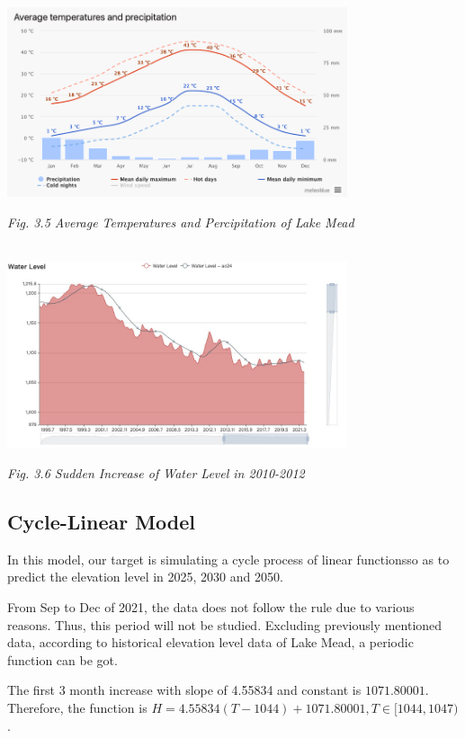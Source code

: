\documentclass[12pt]{article}
\theoremstyle{definition}
\theoremstyle{remark}
\numberwithin{equation}{section}
\begin{document}
		\begin{center}
			\includegraphics[width=10cm]{3.5 Average Temperatures and Percipitation of Lake Mead.png}
			
			\small \textit{Fig. 3.5 Average Temperatures and Percipitation of Lake Mead \cite{Temperature and Percipitation Data}}
			
			~\\

			\includegraphics[width=10cm]{3.6 Sudden Increase of Water Level in 2010-2012.jpg}
			
			\small \textit{Fig. 3.6 Sudden Increase of Water Level in 2010-2012}
		\end{center}
		
	\subsection{Cycle-Linear Model}

		In this model, our target is simulating a cycle process of linear functionsso as to predict the elevation level in 2025, 2030 and 2050.

		From Sep to Dec of 2021, the data does not follow the rule due to various reasons. Thus, this period will not be studied. Excluding previously mentioned data, according to historical elevation level data of Lake Mead, a periodic function can be got. 
			
		The first 3 month increase with slope of 4.55834 and constant is $1071.80001$. Therefore, the function is $H = 4.55834(T-1044)+1071.80001, T \in [1044, 1047)$.
\end{document}
